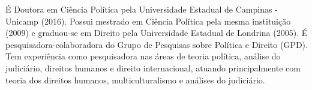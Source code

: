 
\begin{cvparagraph}

É Doutora em Ciência Política pela Universidade Estadual de Campinas - Unicamp (2016). Possui mestrado em Ciência Política pela mesma instituição (2009) e graduou-se em Direito pela Universidade Estadual de Londrina (2005). É pesquisadora-colaboradora do Grupo de Pesquisas sobre Política e Direito (GPD). Tem experiência como pesquisadora nas áreas de teoria política, análise do judiciário, direitos humanos e direito internacional, atuando principalmente com teoria dos direitos humanos, multiculturalismo e análises do judiciário.

\end{cvparagraph}
